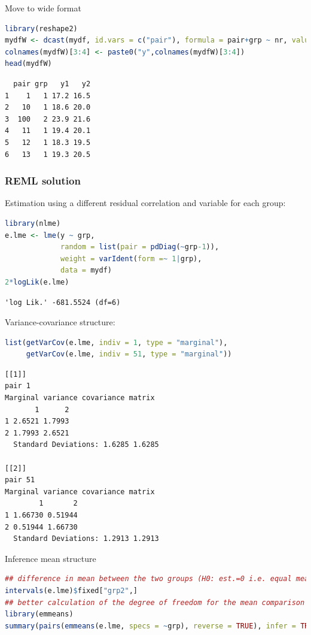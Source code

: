\documentclass{article}
\begin{document}
Move to wide format
\begin{lstlisting}[language=r,numbers=none]
library(reshape2)
mydfW <- dcast(mydf, id.vars = c("pair"), formula = pair+grp ~ nr, value.var = "y")
colnames(mydfW)[3:4] <- paste0("y",colnames(mydfW)[3:4])
head(mydfW)
\end{lstlisting}

\label{}
\begin{verbatim}
  pair grp   y1   y2
1    1   1 17.2 16.5
2   10   1 18.6 20.0
3  100   2 23.9 21.6
4   11   1 19.4 20.1
5   12   1 18.3 19.5
6   13   1 19.3 20.5
\end{verbatim}
\subsubsection{REML solution}
\label{sec:org192b2bf}
Estimation using a different residual correlation and variable for each group:
\begin{lstlisting}[language=r,numbers=none]
library(nlme)
e.lme <- lme(y ~ grp,
             random = list(pair = pdDiag(~grp-1)),
             weight = varIdent(form =~ 1|grp),
             data = mydf)
2*logLik(e.lme)
\end{lstlisting}

\label{}
\begin{verbatim}
'log Lik.' -681.5524 (df=6)
\end{verbatim}


\clearpage

Variance-covariance structure:
\begin{lstlisting}[language=r,numbers=none]
list(getVarCov(e.lme, indiv = 1, type = "marginal"),
     getVarCov(e.lme, indiv = 51, type = "marginal"))
\end{lstlisting}

\label{}
\begin{verbatim}
[[1]]
pair 1 
Marginal variance covariance matrix
       1      2
1 2.6521 1.7993
2 1.7993 2.6521
  Standard Deviations: 1.6285 1.6285 

[[2]]
pair 51 
Marginal variance covariance matrix
        1       2
1 1.66730 0.51944
2 0.51944 1.66730
  Standard Deviations: 1.2913 1.2913
\end{verbatim}

Inference mean structure
\begin{lstlisting}[language=r,numbers=none]
## difference in mean between the two groups (H0: est.=0 i.e. equal means)
intervals(e.lme)$fixed["grp2",]
## better calculation of the degree of freedom for the mean comparison
library(emmeans)
summary(pairs(emmeans(e.lme, specs = ~grp), reverse = TRUE), infer = TRUE)
\end{lstlisting}
\end{document}
